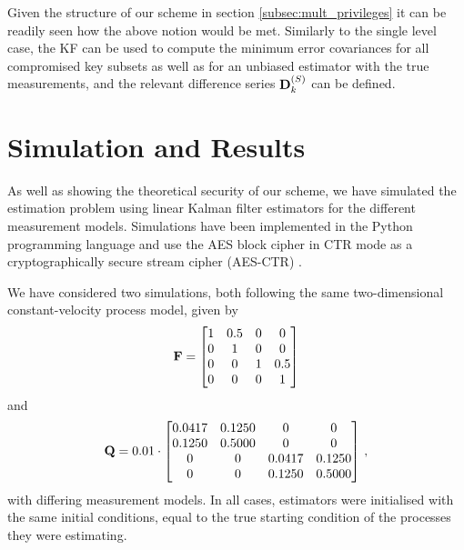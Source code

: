 \documentclass[letterpaper, 10 pt, conference]{IEEEtran}
\theoremstyle{definition}
\begin{document}
Given the structure of our scheme in section \ref{subsec:mult_privileges} it can be readily seen how the above notion would be met. Similarly to the single level case, the KF can be used to compute the minimum error covariances for all compromised key subsets as well as for an unbiased estimator with the true measurements, and the relevant difference series ${{\mathbf{D}}}^{(S)}_k$ can be defined. 

% 
%                                 
%                                 
%                                 
% 

\section{Simulation and Results}\label{sec:simulation}
As well as showing the theoretical security of our scheme, we have simulated the estimation problem using linear Kalman filter estimators for the different measurement models. Simulations have been implemented in the Python programming language and use the AES block cipher in CTR mode as a cryptographically secure stream cipher (AES-CTR) \cite{gueronIntelAdvancedEncryption2010}.

We have considered two simulations, both following the same two-dimensional constant-velocity process model, given by
\begin{equation*}
   {\ensuremath{{\mathbf{F}}}}=
   \begin{bmatrix}
      1 & 0.5 & 0 & 0\\
      0 & 1 & 0 & 0\\
      0 & 0 & 1 & 0.5\\
      0 & 0 & 0 & 1
   \end{bmatrix}
\end{equation*}
and
\begin{equation*}
   {\ensuremath{{\mathbf{Q}}}}=0.01\cdot
   \begin{bmatrix}
      0.0417 & 0.1250 & 0 & 0\\
      0.1250 & 0.5000 & 0 & 0\\
      0 & 0 & 0.0417 & 0.1250\\
      0 & 0 & 0.1250 & 0.5000
   \end{bmatrix}\,,
\end{equation*}
with differing measurement models. In all cases, estimators were initialised with the same initial conditions, equal to the true starting condition of the processes they were estimating.
\end{document}
